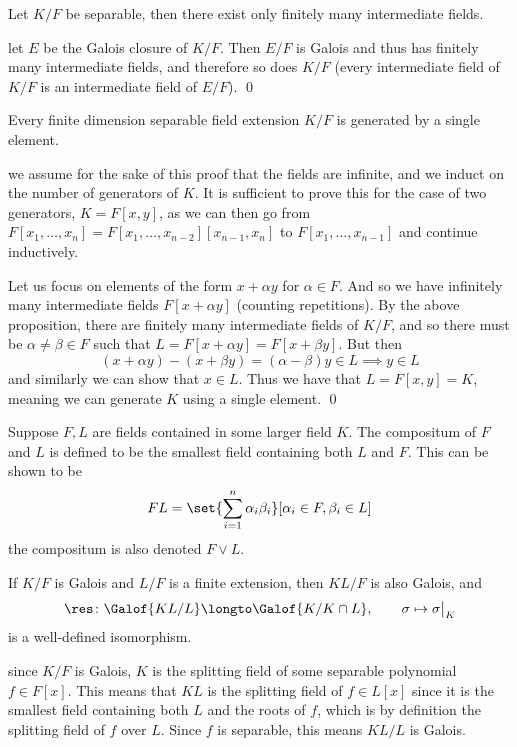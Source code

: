 \bprop

    Let $K/F$ be separable, then there exist only finitely many intermediate fields.

\eprop

\Proof let $E$ be the Galois closure of $K/F$.
Then $E/F$ is Galois and thus has finitely many intermediate fields, and therefore so does $K/F$ (every intermediate field of $K/F$ is an intermediate field of $E/F$).
\qed

\bthrm[title=Steinitz's Theorem, name=steinitz]

    Every finite dimension separable field extension $K/F$ is generated by a single element.

\ethrm

\Proof we assume for the sake of this proof that the fields are infinite, and we induct on the number of generators of $K$.
It is sufficient to prove this for the case of two generators, $K=F[x,y]$, as we can then go from $F[x_1,\dots,x_n]=F[x_1,\dots,x_{n-2}][x_{n-1},x_n]$ to $F[x_1,\dots,x_{n-1}]$ and continue inductively.

Let us focus on elements of the form $x+\alpha y$ for $\alpha\in F$.
And so we have infinitely many intermediate fields $F[x+\alpha y]$ (counting repetitions).
By the above proposition, there are finitely many intermediate fields of $K/F$, and so there must be $\alpha\neq\beta\in F$ such that $L=F[x+\alpha y]=F[x+\beta y]$.
But then
$$ (x+\alpha y) - (x+\beta y) = (\alpha-\beta)y \in L \implies y\in L $$
and similarly we can show that $x\in L$.
Thus we have that $L=F[x,y]=K$, meaning we can generate $K$ using a single element.
\qed

\bdefn

    Suppose $F,L$ are fields contained in some larger field $K$.
    The {\emphcolor compositum} of $F$ and $L$ is defined to be the smallest field containing both $L$ and $F$.
    This can be shown to be
    $$ FL = \set{\sum_{i=1}^n\alpha_i\beta_i}[\alpha_i\in F,\beta_i\in L] $$
    the compositum is also denoted $F\vee L$.

\edefn

\bprop

    If $K/F$ is Galois and $L/F$ is a finite extension, then $KL/F$ is also Galois, and
    $$ \res\colon\Galof{KL/L}\longto\Galof{K/K\cap L},\qquad \sigma\mapsto\sigma\bigl|_K $$
    is a well-defined isomorphism.

\eprop

\Proof since $K/F$ is Galois, $K$ is the splitting field of some separable polynomial $f\in F[x]$.
This means that $KL$ is the splitting field of $f\in L[x]$ since it is the smallest field containing both $L$ and the roots of $f$, which is by definition the splitting field of $f$ over $L$.
Since $f$ is separable, this means $KL/L$ is Galois.

